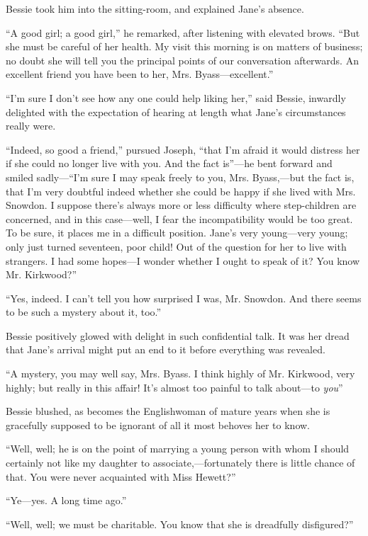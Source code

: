 Bessie took him into the sitting-room, and explained Jane's absence.

``A good girl; a good girl,'' he remarked, after listening with elevated
brows. ``But she must be careful of her health. My visit this morning is
on matters of business; no doubt she will tell you the principal points
of our conversation afterwards. An excellent friend you have been to
her, Mrs. Byass---excellent.''

{}``I'm sure I don't see how any one could help liking her,'' said
Bessie, inwardly delighted with the expectation of hearing at length
what Jane's circumstances really were.

``Indeed, so good a friend,'' pursued Joseph, ``that I'm afraid it would
distress her if she could no longer live with you. And the fact
is''---he bent forward and smiled sadly---``I'm sure I may speak freely
to you, Mrs. Byass,---but the fact is, that I'm very doubtful indeed
whether she could be happy if she lived with Mrs. Snowdon. I suppose
there's always more or less difficulty where step-children are
concerned, and in this case---well, I fear the incompatibility would be
too great. To be sure, it places me in a difficult position. Jane's very
young---very young; only just turned seventeen, poor child! Out of the
question for her to live with strangers. I had some hopes---I wonder
whether I ought to speak of it? You know Mr. Kirkwood?''

``Yes, indeed. I can't tell you how surprised I was, Mr. Snowdon. And
there seems to be such a mystery about it, too.''

Bessie positively glowed with delight in such confidential talk. It was
her dread that {}Jane's arrival might put an end to it before everything
was revealed.

``A mystery, you may well say, Mrs. Byass. I think highly of Mr.
Kirkwood, very highly; but really in this affair! It's almost too
painful to talk about---to \emph{you}''

Bessie blushed, as becomes the Englishwoman of mature years when she is
gracefully supposed to be ignorant of all it most behoves her to know.

``Well, well; he is on the point of marrying a young person with whom I
should certainly not like my daughter to associate,---fortunately there
is little chance of that. You were never acquainted with Miss Hewett?''

``Ye---yes. A long time ago.''

``Well, well; we must be charitable. You know that she is dreadfully
disfigured?''

